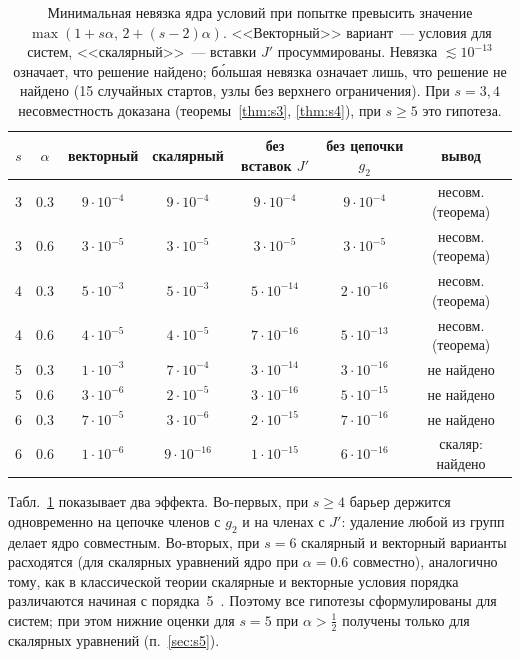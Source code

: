 \documentclass[11pt,a4paper]{article}
\theoremstyle{plain}
\theoremstyle{definition}
\begin{document}
\begin{table}[ht]
\centering\small
\caption{Минимальная невязка ядра условий при попытке превысить значение $\max(1+s\alpha,\,2+(s-2)\alpha)$. <<Векторный>> вариант~--- условия для систем, <<скалярный>>~--- вставки $J'$ просуммированы. Невязка $\lesssim10^{-13}$ означает, что решение найдено; бо́льшая невязка означает лишь, что решение не найдено (15 случайных стартов, узлы без верхнего ограничения). При $s=3,4$ несовместность доказана (теоремы~\ref{thm:s3}, \ref{thm:s4}), при $s\ge5$ это гипотеза.}\label{tab:core}
\begin{tabular}{ccccccc}
\toprule
$s$ & $\alpha$ & векторный & скалярный & без вставок $J'$ & без цепочки $g_2$ & вывод\\
\midrule
3 & 0.3 & $9\cdot10^{-4}$ & $9\cdot10^{-4}$ & $9\cdot10^{-4}$ & $9\cdot10^{-4}$ & несовм. (теорема)\\
3 & 0.6 & $3\cdot10^{-5}$ & $3\cdot10^{-5}$ & $3\cdot10^{-5}$ & $3\cdot10^{-5}$ & несовм. (теорема)\\
4 & 0.3 & $5\cdot10^{-3}$ & $5\cdot10^{-3}$ & $5\cdot10^{-14}$ & $2\cdot10^{-16}$ & несовм. (теорема)\\
4 & 0.6 & $4\cdot10^{-5}$ & $4\cdot10^{-5}$ & $7\cdot10^{-16}$ & $5\cdot10^{-13}$ & несовм. (теорема)\\
5 & 0.3 & $1\cdot10^{-3}$ & $7\cdot10^{-4}$ & $3\cdot10^{-14}$ & $3\cdot10^{-16}$ & не найдено\\
5 & 0.6 & $3\cdot10^{-6}$ & $2\cdot10^{-5}$ & $3\cdot10^{-16}$ & $5\cdot10^{-15}$ & не найдено\\
6 & 0.3 & $7\cdot10^{-5}$ & $3\cdot10^{-6}$ & $2\cdot10^{-15}$ & $7\cdot10^{-16}$ & не найдено\\
6 & 0.6 & $1\cdot10^{-6}$ & $9\cdot10^{-16}$ & $1\cdot10^{-15}$ & $6\cdot10^{-16}$ & скаляр: найдено\\
\bottomrule
\end{tabular}
\end{table}

Табл.~\ref{tab:core} показывает два эффекта. Во-первых, при $s\ge4$ барьер держится одновременно на цепочке членов с $g_2$ и на членах с $J'$: удаление любой из групп делает ядро совместным. Во-вторых, при $s=6$ скалярный и векторный варианты расходятся (для скалярных уравнений ядро при $\alpha=0.6$ совместно), аналогично тому, как в классической теории скалярные и векторные условия порядка различаются начиная с порядка~5~\cite{Butcher2016}. Поэтому все гипотезы сформулированы для систем; при этом нижние оценки для $s=5$ при $\alpha>\frac12$ получены только для скалярных уравнений (п.~\ref{sec:s5}).
\end{document}
